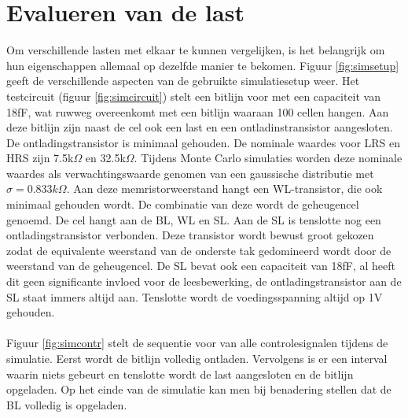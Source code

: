 \section{Evalueren van de last}
Om verschillende lasten met elkaar te kunnen vergelijken, is het belangrijk om hun eigenschappen allemaal op dezelfde manier te bekomen. Figuur \ref{fig:simsetup} geeft de verschillende aspecten van de gebruikte simulatiesetup weer. Het testcircuit (figuur \ref{fig:simcircuit}) stelt een bitlijn voor met een capaciteit van 18fF, wat ruwweg overeenkomt met een bitlijn waaraan 100 cellen hangen. Aan deze bitlijn zijn naast de cel ook een last en een ontladinstransistor aangesloten. De ontladingstransistor is minimaal gehouden. De nominale waardes voor LRS en HRS zijn 7.5k$\Omega$ en 32.5k$\Omega$. Tijdens Monte Carlo simulaties worden deze nominale waardes als verwachtingswaarde genomen van een gaussische distributie met $\sigma = 0.833k\Omega$. Aan deze memristorweerstand hangt een WL-transistor, die ook minimaal gehouden wordt. De combinatie van deze wordt de geheugencel genoemd. De cel hangt aan de BL, WL en SL. Aan de SL is tenslotte nog een ontladingstransistor verbonden. Deze transistor wordt bewust groot gekozen zodat de equivalente weerstand van de onderste tak gedomineerd wordt door de weerstand van de geheugencel. De SL bevat ook een capaciteit van 18fF, al heeft dit geen significante invloed voor de leesbewerking, de ontladingstransistor aan de SL staat immers altijd aan. Tenslotte wordt de voedingsspanning altijd op 1V gehouden.\\\\
Figuur \ref{fig:simcontr} stelt de sequentie voor van alle controlesignalen tijdens de simulatie. Eerst wordt de bitlijn volledig ontladen. Vervolgens is er een interval waarin niets gebeurt en tenslotte wordt de last aangesloten en de bitlijn opgeladen. Op het einde van de simulatie kan men bij benadering stellen dat de BL volledig is opgeladen.\\

